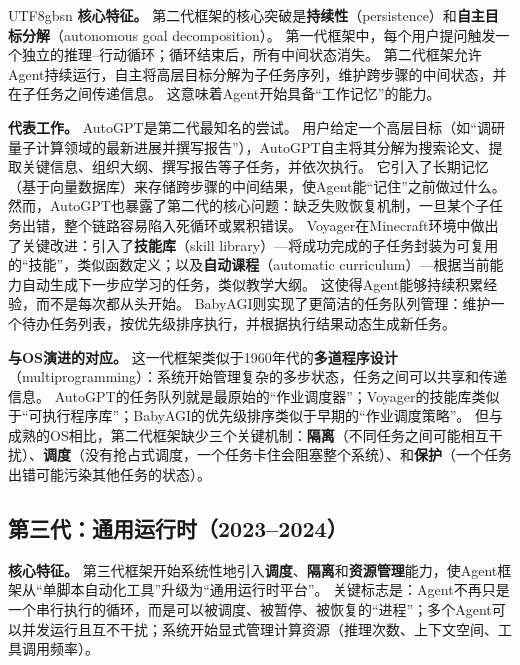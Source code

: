 \documentclass[11pt,a4paper]{article}
\begin{document}
\begin{CJK*}{UTF8}{gbsn}
\textbf{核心特征。}
第二代框架的核心突破是\textbf{持续性}（persistence）和\textbf{自主目标分解}（autonomous goal decomposition）。
第一代框架中，每个用户提问触发一个独立的推理--行动循环；循环结束后，所有中间状态消失。
第二代框架允许Agent持续运行，自主将高层目标分解为子任务序列，维护跨步骤的中间状态，并在子任务之间传递信息。
这意味着Agent开始具备``工作记忆''的能力。

\textbf{代表工作。}
AutoGPT\cite{autogpt_repo_2026}是第二代最知名的尝试。
用户给定一个高层目标（如``调研量子计算领域的最新进展并撰写报告''），AutoGPT自主将其分解为搜索论文、提取关键信息、组织大纲、撰写报告等子任务，并依次执行。
它引入了长期记忆（基于向量数据库）来存储跨步骤的中间结果，使Agent能``记住''之前做过什么。
然而，AutoGPT也暴露了第二代的核心问题：缺乏失败恢复机制，一旦某个子任务出错，整个链路容易陷入死循环或累积错误。
Voyager\cite{wang2023voyager}在Minecraft环境中做出了关键改进：引入了\textbf{技能库}（skill library）---将成功完成的子任务封装为可复用的``技能''，类似函数定义；以及\textbf{自动课程}（automatic curriculum）---根据当前能力自动生成下一步应学习的任务，类似教学大纲。
这使得Agent能够持续积累经验，而不是每次都从头开始。
BabyAGI则实现了更简洁的任务队列管理：维护一个待办任务列表，按优先级排序执行，并根据执行结果动态生成新任务。

\textbf{与OS演进的对应。}
这一代框架类似于1960年代的\textbf{多道程序设计}（multiprogramming）：系统开始管理复杂的多步状态，任务之间可以共享和传递信息。
AutoGPT的任务队列就是最原始的``作业调度器''；Voyager的技能库类似于``可执行程序库''；BabyAGI的优先级排序类似于早期的``作业调度策略''。
但与成熟的OS相比，第二代框架缺少三个关键机制：\textbf{隔离}（不同任务之间可能相互干扰）、\textbf{调度}（没有抢占式调度，一个任务卡住会阻塞整个系统）、和\textbf{保护}（一个任务出错可能污染其他任务的状态）。

\subsection*{第三代：通用运行时（2023--2024）}

\textbf{核心特征。}
第三代框架开始系统性地引入\textbf{调度}、\textbf{隔离}和\textbf{资源管理}能力，使Agent框架从``单脚本自动化工具''升级为``通用运行时平台''。
关键标志是：Agent不再只是一个串行执行的循环，而是可以被调度、被暂停、被恢复的``进程''；多个Agent可以并发运行且互不干扰；系统开始显式管理计算资源（推理次数、上下文空间、工具调用频率）。


\end{CJK*}
\end{document}
